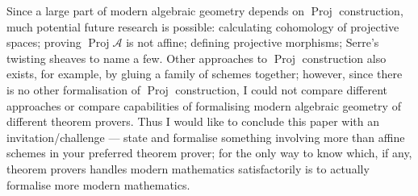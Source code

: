 \documentclass[a4paper,UKenglish,cleveref, autoref, thm-restate]{lipics-v2021}
\begin{document}
Since a large part of modern algebraic geometry depends on $\operatorname{Proj}$ construction, much potential future research is possible: calculating cohomology of projective spaces; proving $\operatorname{Proj}\mathcal A$ is not affine; defining projective morphisms; Serre's twisting sheaves to name a few. Other approaches to $\operatorname{Proj}$ construction also exists, for example, by gluing a family of schemes together; however, since there is no other formalisation of $\operatorname{Proj}$ construction, I could not compare different approaches or compare capabilities of formalising modern algebraic geometry of different theorem provers. Thus I would like to conclude this paper with an invitation/challenge --- state and formalise something involving more than affine schemes in your preferred theorem prover; for the only way to know which, if any, theorem provers handles modern mathematics satisfactorily is to actually formalise more modern mathematics.


\end{document}
